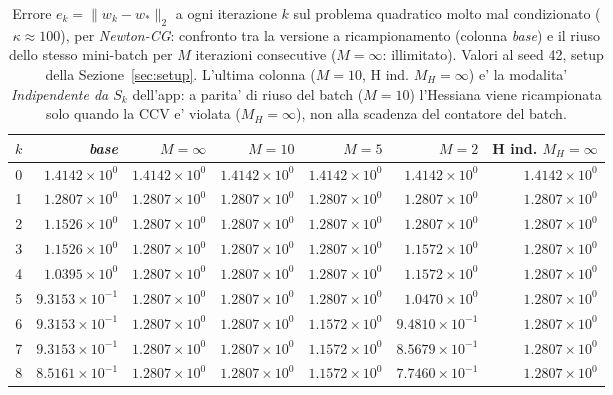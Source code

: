 \begin{table}[H]
\centering
\footnotesize
\renewcommand{\arraystretch}{0.85}
\setlength{\tabcolsep}{2pt}
\caption{Errore $e_k=\|w_k-w_*\|_2$ a ogni iterazione $k$ sul problema quadratico molto mal condizionato ($\kappa\approx 100$), per \emph{Newton-CG}: confronto tra la versione a ricampionamento (colonna \emph{base}) e il riuso dello stesso mini-batch per $M$ iterazioni consecutive ($M=\infty$: illimitato). Valori al seed 42, setup della Sezione~\ref{sec:setup}. L'ultima colonna ($M{=}10$, H ind. $M_H{=}\infty$) e' la modalita' \emph{Indipendente da $S_k$} dell'app: a parita' di riuso del batch ($M=10$) l'Hessiana viene ricampionata solo quando la CCV e' violata ($M_H=\infty$), non alla scadenza del contatore del batch.}
\label{tab:riuso_veryill_ncg}
\begin{tabular}{@{}rrrrrrr@{}}
\toprule
$k$ & \emph{base} & $M{=}\infty$ & $M{=}10$ & $M{=}5$ & $M{=}2$ & H ind. $M_H{=}\infty$\\
\midrule
0 & $1.4142\times10^{0}$ & $1.4142\times10^{0}$ & $1.4142\times10^{0}$ & $1.4142\times10^{0}$ & $1.4142\times10^{0}$ & $1.4142\times10^{0}$\\
1 & $1.2807\times10^{0}$ & $1.2807\times10^{0}$ & $1.2807\times10^{0}$ & $1.2807\times10^{0}$ & $1.2807\times10^{0}$ & $1.2807\times10^{0}$\\
2 & $1.1526\times10^{0}$ & $1.2807\times10^{0}$ & $1.2807\times10^{0}$ & $1.2807\times10^{0}$ & $1.2807\times10^{0}$ & $1.2807\times10^{0}$\\
3 & $1.1526\times10^{0}$ & $1.2807\times10^{0}$ & $1.2807\times10^{0}$ & $1.2807\times10^{0}$ & $1.1572\times10^{0}$ & $1.2807\times10^{0}$\\
4 & $1.0395\times10^{0}$ & $1.2807\times10^{0}$ & $1.2807\times10^{0}$ & $1.2807\times10^{0}$ & $1.1572\times10^{0}$ & $1.2807\times10^{0}$\\
5 & $9.3153\times10^{-1}$ & $1.2807\times10^{0}$ & $1.2807\times10^{0}$ & $1.2807\times10^{0}$ & $1.0470\times10^{0}$ & $1.2807\times10^{0}$\\
6 & $9.3153\times10^{-1}$ & $1.2807\times10^{0}$ & $1.2807\times10^{0}$ & $1.1572\times10^{0}$ & $9.4810\times10^{-1}$ & $1.2807\times10^{0}$\\
7 & $9.3153\times10^{-1}$ & $1.2807\times10^{0}$ & $1.2807\times10^{0}$ & $1.1572\times10^{0}$ & $8.5679\times10^{-1}$ & $1.2807\times10^{0}$\\
8 & $8.5161\times10^{-1}$ & $1.2807\times10^{0}$ & $1.2807\times10^{0}$ & $1.1572\times10^{0}$ & $7.7460\times10^{-1}$ & $1.2807\times10^{0}$\\

\end{tabular}
\end{table}
